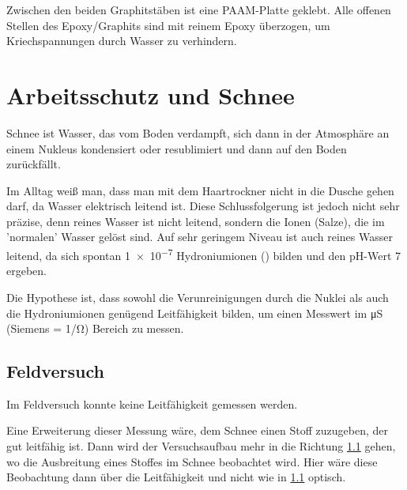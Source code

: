 Zwischen den beiden Graphitstäben ist eine PAAM-Platte geklebt. Alle offenen Stellen des Epoxy/Graphits sind mit reinem Epoxy überzogen, um Kriechspannungen durch Wasser zu verhindern.

\section{Arbeitsschutz und Schnee}

Schnee ist Wasser, das vom Boden verdampft, sich dann in der Atmosphäre an einem Nukleus kondensiert oder resublimiert und dann auf den Boden zurückfällt.

Im Alltag weiß man, dass man mit dem Haartrockner nicht in die Dusche gehen darf, da Wasser elektrisch leitend ist. Diese Schlussfolgerung ist jedoch nicht sehr präzise, denn reines Wasser ist nicht leitend, sondern die Ionen (Salze), die im 'normalen' Wasser gelöst sind. Auf sehr geringem Niveau ist auch reines Wasser leitend, da sich spontan \SI{1e-7}{\molar} Hydroniumionen () bilden und den pH-Wert 7 ergeben.

Die Hypothese ist, dass sowohl die Verunreinigungen durch die Nuklei als auch die Hydroniumionen genügend Leitfähigkeit bilden, um einen Messwert im \si{\micro\siemens} (Siemens = \si{1/\ohm}) Bereich zu messen.

\subsection{Feldversuch}

Im Feldversuch konnte keine Leitfähigkeit gemessen werden.

Eine Erweiterung dieser Messung wäre, dem Schnee einen Stoff zuzugeben, der gut leitfähig ist. Dann wird der Versuchsaufbau mehr in die Richtung \ref{} gehen, wo die Ausbreitung eines Stoffes im Schnee beobachtet wird. Hier wäre diese Beobachtung dann über die Leitfähigkeit und nicht wie in \ref{} optisch.
